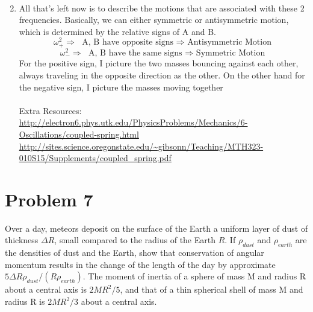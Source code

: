 \documentclass{article}
\begin{document}
\begin{enumerate}[label=\alph*)]
\begin{align}
	\end{align}
	\item %
	All that's left now is to describe the motions that are associated with these 2 frequencies. Basically, we can either symmetric or antisymmetric motion, which is determined by the relative signs of A and B. \\ 
	\[ \omega_+^2 \Longrightarrow \text{ A, B have opposite signs $\Longrightarrow$ Antisymmetric Motion} \]
	\[ \omega_-^2 \Longrightarrow \text{ A, B have the same signs $\Longrightarrow$ Symmetric Motion} \]
	For the positive sign, I picture the two masses bouncing against each other, always traveling in the opposite direction as the other. On the other hand for the negative sign, I picture the masses moving together \\
	\\ 
	Extra Resources: \\ 
	\url{http://electron6.phys.utk.edu/PhysicsProblems/Mechanics/6-Oscillations/coupled-spring.html} \\ 
	\url{http://sites.science.oregonstate.edu/~gibsonn/Teaching/MTH323-010S15/Supplements/coupled_spring.pdf}
\end{enumerate}

\section*{Problem 7} 
Over a day, meteors deposit on the surface of the Earth a uniform layer of dust of thickness $\Delta R$, small compared to the radius of the Earth $R$. If $\rho_{dust}$ and $\rho_{earth}$ are the densities of dust and the Earth, show that conservation of angular momentum results in the change of the length of the day by approximate $5\Delta R \rho_{dust} / (R \rho_{earth})$. The moment of inertia of a sphere of mass M and radius R about a central axis is $2MR^2/5$, and that of a thin spherical shell of mass M and radius R is $2MR^2/3$ about a central axis.
\end{document}
